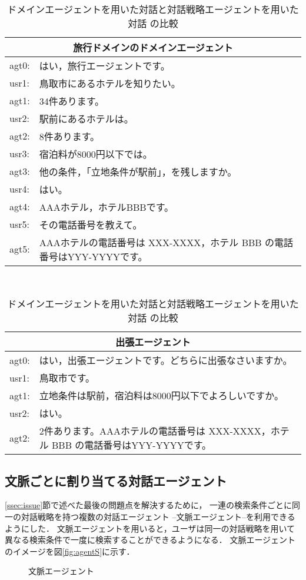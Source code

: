 \begin{table}[ht]
\caption{ドメインエージェントを用いた対話と対話戦略エージェントを用いた対話
の比較}\label{tab:s-agent}

\bigskip
\centering \tt
\begin{tabular}[t]{lp{50mm}}
\multicolumn{2}{c}{旅行ドメインのドメインエージェント}\\
\hline\hline
agt0:& はい，旅行エージェントです。\\
usr1:& 鳥取市にあるホテルを知りたい。\\
agt1:& 34件あります。\\
usr2:& 駅前にあるホテルは。\\
agt2:& 8件あります。\\
usr3:& 宿泊料が8000円以下では。\\
agt3:& 他の条件，「立地条件が駅前」，を残しますか。\\
usr4:& はい。\\
agt4:& AAAホテル，ホテルBBBです。\\
usr5:& その電話番号を教えて。\\
agt5:& AAAホテルの電話番号は XXX-XXXX，ホテル BBB の電話番号はYYY-YYYYです。\\
\hline\hline
\end{tabular}　
\begin{tabular}[t]{lp{50mm}}
\multicolumn{2}{c}{出張エージェント}\\
\hline\hline
agt0:& はい，出張エージェントです。どちらに出張なさいますか。\\
usr1:& 鳥取市です。\\
agt1:& 立地条件は駅前，宿泊料は8000円以下でよろしいですか。\\
usr2:& はい。\\
agt2:& 2件あります。AAAホテルの電話番号は XXX-XXXX，ホテル BBB の電話番号はYYY-YYYYです。\\
\hline\hline
\end{tabular}
\end{table}

\subsection{文脈ごとに割り当てる対話エージェント}

\ref{ssec:issue}節で述べた最後の問題点を解決するために，
一連の検索条件ごとに同一の対話戦略を持つ複数の対話エージェント
--文脈エージェント--を利用できるようにした．
文脈エージェントを用いると，ユーザは同一の対話戦略を用いて
異なる検索条件で一度に検索することができるようになる．
文脈エージェントのイメージを図\ref{fig:agentS}に示す．
\begin{figure}[htbp]
\begin{center}
\end{center}
\caption{文脈エージェント}\label{fig:agentC}
\end{figure}

